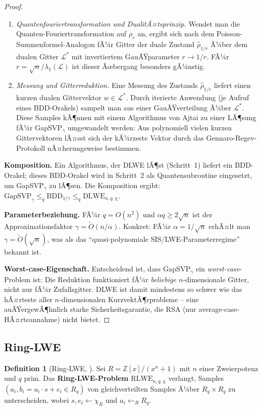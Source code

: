﻿\documentclass[a4paper,12pt]{article}
\theoremstyle{definition}
\newtheorem{definition}{Definition}[section]
\begin{document}
\begin{proof}
\begin{enumerate}
\item[(b)] \emph{Quantenfouriertransformation und DualitÃ¤tsprinzip.}
Wendet man die Quanten-Fouriertransformation auf $\rho_r$ an, ergibt sich
nach dem Poisson-Summenformel-Analogon fÃ¼r Gitter der duale Zustand
$\hat{\rho}_{1/r}$ Ã¼ber dem dualen Gitter $\mathcal{L}^*$ mit invertiertem
GauÃŸparameter $r \to 1/r$. FÃ¼r $r = \sqrt{n}/\lambda_1(\mathcal{L})$ ist dieser
Ãœbergang besonders gÃ¼nstig.

\item[(c)] \emph{Messung und Gitterreduktion.}
Eine Messung des Zustands $\hat{\rho}_{1/r}$ liefert einen kurzen dualen
Gittervektor $w \in \mathcal{L}^*$. Durch iterierte Anwendung
(je Aufruf eines BDD-Orakels) sampelt man aus einer GauÃŸverteilung Ã¼ber
$\mathcal{L}^*$. Diese Samples kÃ¶nnen mit einem Algorithmus von Ajtai \cite{Ajt96}
zu einer LÃ¶sung fÃ¼r GapSVP$_\gamma$ umgewandelt werden:
Aus polynomiell vielen kurzen Gittervektoren lÃ¤sst sich der kÃ¼rzeste Vektor
durch das Gennaro-Regev-Protokoll nÃ¤herungsweise bestimmen.
\end{enumerate}

\textbf{Komposition.}
Ein Algorithmus, der DLWE lÃ¶st (Schritt~1) liefert ein BDD-Orakel;
dieses BDD-Orakel wird in Schritt~2 als Quantensubroutine eingesetzt,
um GapSVP$_\gamma$ zu lÃ¶sen. Die Komposition ergibt:
$\mathrm{GapSVP}_\gamma \leq_q \mathrm{BDD}_{1/\gamma} \leq_q \mathrm{DLWE}_{n,q,\chi}$.

\textbf{Parameterbeziehung.}
FÃ¼r $q = O(n^2)$ und $\alpha q \geq 2\sqrt{n}$ ist der Approximationsfaktor
$\gamma = \tilde{O}(n/\alpha)$. Konkret: FÃ¼r $\alpha = 1/\sqrt{n}$ erhÃ¤lt man
$\gamma = \tilde{O}(\sqrt{n})$, was als das ``quasi-polynomiale SIS/LWE-Parameterregime'' bekannt ist.

\textbf{Worst-case-Eigenschaft.}
Entscheidend ist, dass GapSVP$_\gamma$ ein \emph{worst-case}-Problem ist:
Die Reduktion funktioniert fÃ¼r \emph{beliebige} $n$-dimensionale Gitter,
nicht nur fÃ¼r Zufallsgitter. DLWE ist damit mindestens so schwer wie das
hÃ¤rteste aller $n$-dimensionalen KurzvektÃ¶rprobleme -- eine auÃŸergewÃ¶hnlich
starke Sicherheitsgarantie, die RSA (nur average-case-HÃ¤rteannahme) nicht bietet.
\end{proof}

\subsection{Ring-LWE}

\begin{definition}[Ring-LWE, \cite{LPR10}]
Sei $R = \mathbb{Z}[x]/(x^n + 1)$ mit $n$ einer Zweierpotenz und $q$ prim.
Das \textbf{Ring-LWE-Problem} $\mathrm{RLWE}_{n,q,\chi}$ verlangt,
Samples $(a_i, b_i = a_i \cdot s + e_i \in R_q)$ von gleichverteilten
Samples Ã¼ber $R_q \times R_q$ zu unterscheiden, wobei $s, e_i \leftarrow \chi_R$
und $a_i \leftarrow_R R_q$.
\end{definition}
\end{document}
